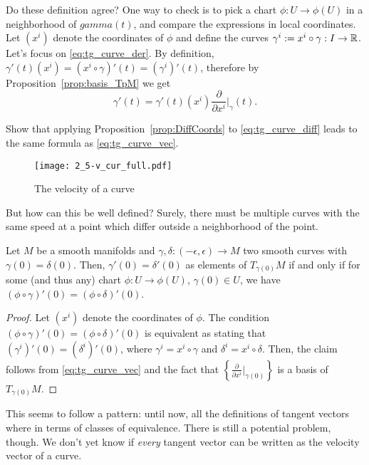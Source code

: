 Do these definition agree?
One way to check is to pick a chart $\phi: U \to \phi(U)$ in a neighborhood of $gamma(t)$, and compare the expressions in local coordinates. Let $(x^i)$ denote the coordinates of $\phi$ and define the curves $\gamma^i := x^i \circ \gamma : I\to\mathbb{R}$.
Let's focus on \eqref{eq:tg_curve_der}. By definition, $\gamma'(t)(x^i) = (x^i\circ\gamma)'(t) = (\gamma^i)'(t)$, therefore by Proposition~\ref{prop:basis_TpM} we get
\begin{equation}\label{eq:tg_curve_vec}
  \gamma'(t) = %
    \gamma'(t)(x^i) \frac{\partial}{\partial x^i}\Big|_\gamma(t).
\end{equation}
\begin{exercise}
  Show that applying Proposition~\ref{prop:DiffCoords} to \eqref{eq:tg_curve_diff} leads to the same formula as \eqref{eq:tg_curve_vec}.
\end{exercise}

\begin{figure*}[htp]
  \centering
  \texttt{[image: 2\_5-v\_cur\_full.pdf]}
  \caption{The velocity of a curve}
  \label{fig:2_5-v_cur_full}
\end{figure*}

But how can this be well defined? Surely, there must be multiple curves with the same speed at a point which differ outside a neighborhood of the point.

\begin{lemma}\label{lem:equiv_tg_curves}
  Let $M$ be a smooth manifolds and $\gamma, \delta : (-\epsilon, \epsilon) \to M$ two smooth curves with $\gamma(0) = \delta(0)$. Then, $\gamma'(0) = \delta'(0)$ as elements of $T_{\gamma(0)}M$ if and only if for some (and thus any) chart $\phi:U\to\phi(U)$, $\gamma(0)\in U$, we have $(\phi\circ \gamma)'(0) = (\phi\circ\delta)'(0)$.
\end{lemma}
\begin{proof}
  Let $(x^i)$ denote the coordinates of $\phi$. The condition $(\phi\circ \gamma)'(0) = (\phi\circ\delta)'(0)$ is equivalent as stating that $(\gamma^i)'(0) = (\delta^i)'(0)$, where $\gamma^i = x^i\circ\gamma$ and $\delta^i=x^i\circ\delta$. Then, the claim follows from \eqref{eq:tg_curve_vec} and the fact that $\left\{\frac{\partial}{\partial x^i}\big|_{\gamma(0)}\right\}$ is a basis of $T_{\gamma(0)}M$.
\end{proof}

This seems to follow a pattern: until now, all the definitions of tangent vectors where in terms of classes of equivalence.
There is still a potential problem, though. We don't yet know if \emph{every} tangent vector can be written as the velocity vector of a curve.

